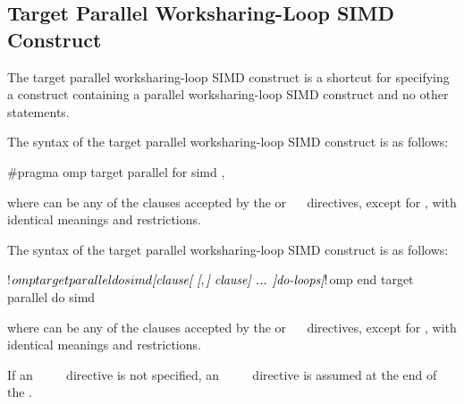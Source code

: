 \subsection{Target Parallel Worksharing-Loop SIMD Construct}
\label{subsec:Target Parallel Worksharing-Loop SIMD Construct}
\summary
The target parallel worksharing-loop SIMD construct is a shortcut for specifying a 
construct containing a parallel worksharing-loop SIMD construct and no other statements.

\syntax
\begin{ccppspecific}
The syntax of the target parallel worksharing-loop SIMD construct is as follows:

\begin{ompcPragma}
#pragma omp target parallel for simd \plc{[clause[
[},\plc{] clause] ... ] new-line}
\end{ompcPragma}

where  can be any of the clauses accepted by the  or
~~ directives, except for , with identical meanings and restrictions.
\end{ccppspecific}

\begin{fortranspecific}
The syntax of the target parallel worksharing-loop SIMD construct is as follows:

\begin{ompfPragma}
!$omp target parallel do simd \plc{[clause[ [},\plc{] clause] ... ]}
    \plc{do-loops}
\plc{[}!$omp end target parallel do simd\plc{]}
\end{ompfPragma}

where  can be any of the clauses accepted by the  or
~~ directives, except for , with identical meanings and restrictions.

If an ~~~~ directive is not specified, an
~~~~ directive is assumed at the end of
the .
\end{fortranspecific}

